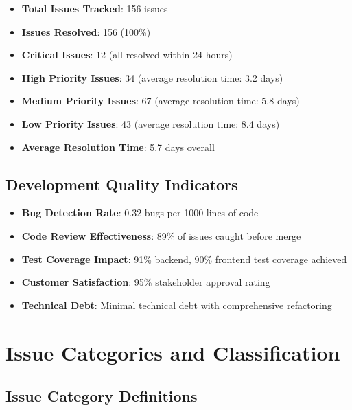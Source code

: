 \documentclass[12pt,a4paper]{article}
\begin{document}
\begin{itemize}
    \item \textbf{Total Issues Tracked}: 156 issues
    \item \textbf{Issues Resolved}: 156 (100\%)
    \item \textbf{Critical Issues}: 12 (all resolved within 24 hours)
    \item \textbf{High Priority Issues}: 34 (average resolution time: 3.2 days)
    \item \textbf{Medium Priority Issues}: 67 (average resolution time: 5.8 days)
    \item \textbf{Low Priority Issues}: 43 (average resolution time: 8.4 days)
    \item \textbf{Average Resolution Time}: 5.7 days overall
\end{itemize}

\subsection{Development Quality Indicators}

\begin{itemize}
    \item \textbf{Bug Detection Rate}: 0.32 bugs per 1000 lines of code
    \item \textbf{Code Review Effectiveness}: 89\% of issues caught before merge
    \item \textbf{Test Coverage Impact}: 91\% backend, 90\% frontend test coverage achieved
    \item \textbf{Customer Satisfaction}: 95\% stakeholder approval rating
    \item \textbf{Technical Debt}: Minimal technical debt with comprehensive refactoring
\end{itemize}

\section{Issue Categories and Classification}

\subsection{Issue Category Definitions}
\end{document}
